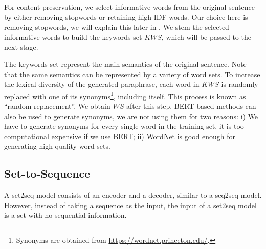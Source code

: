 For content preservation, we select informative words from the original 
sentence by either removing stopwords or retaining high-IDF words. Our choice here is removing stopwords, we will explain this later in . We stem the selected informative words to build the 
keywords set $KWS$, which will be passed to the next stage. 

The keywords set represent the main semantics of the original sentence.
Note that the same semantics can be represented by a variety of word sets.
To increase the lexical diversity of the generated paraphrase,
each word in $KWS$ is randomly replaced with one of its synonyms\footnote{Synonyms 
are obtained from \url{https://wordnet.princeton.edu/}.}, including itself. This process is known as ``random replacement''. We obtain $WS$ after this step. 
BERT based methods can also be used to generate synonyms, 
we are not using them for two reasons: i) We have to generate synonyms 
for every single word in the training set, it is too computational expensive 
if we use BERT; ii) WordNet is good enough for generating high-quality 
word sets.


\subsection{Set-to-Sequence} \label{sec:set2seq}
A set2seq model consists of an encoder and a decoder, similar to a seq2seq model. However, instead of taking a sequence as the input, the input of a set2seq model is a set with no sequential information.

